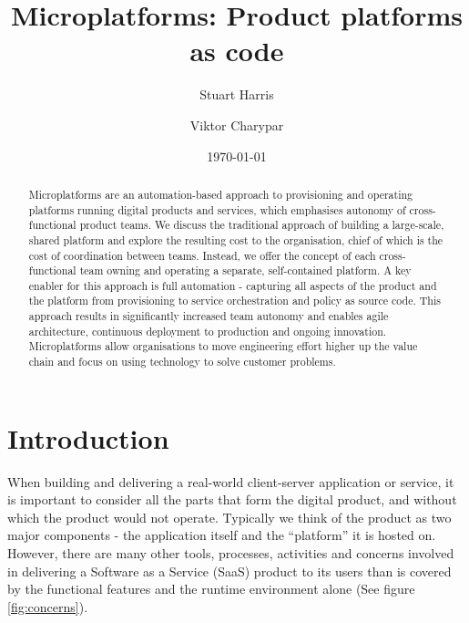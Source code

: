 \documentclass[reprint,amsmath,amssymb,aps]{revtex4-1}
\begin{document}

\title{Microplatforms: Product platforms as code}%

\author{Stuart Harris}
\author{Viktor Charypar}%

\date{\today}

\begin{abstract}
	Microplatforms are an automation-based approach to provisioning and operating platforms running digital products and services, which emphasises autonomy of cross-functional product teams. We discuss the traditional approach of building a large-scale, shared platform and explore the resulting cost to the organisation, chief of which is the cost of coordination between teams. Instead, we offer the concept of each cross-functional team owning and operating a separate, self-contained platform. A key enabler for this approach is full automation - capturing all aspects of the product and the platform from provisioning to service orchestration and policy as source code. This approach results in significantly increased team autonomy and enables agile architecture, continuous deployment to production and ongoing innovation. Microplatforms allow organisations to move engineering effort higher up the value chain and focus on using technology to solve customer problems.
\end{abstract}

\maketitle


\section*{Introduction}
\label{sec:introduction}

When building and delivering a real-world client-server application or service, it is important to consider all the parts that form the digital product, and without which the product would not operate. Typically we think of the product as two major components - the application itself and the ``platform'' it is hosted on. However, there are many other tools, processes, activities and concerns involved in delivering a Software as a Service (SaaS) product to its users than is covered by the functional features and the runtime environment alone (See figure \ref{fig:concerns}).
\end{document}
